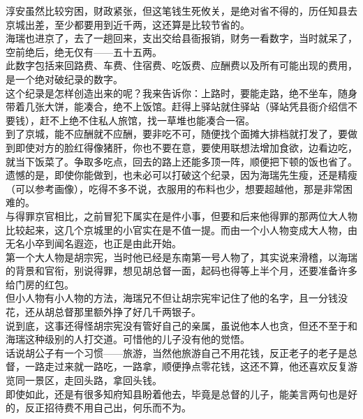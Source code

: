 \begin{multicols}{\theparacolNo}
淳安虽然比较穷困，财政紧张，但这笔钱生死攸关，是绝对省不得的，历任知县去京城出差，至少都要用到近千两，这还算是比较节省的。\\

海瑞也进京了，去了一趟回来，支出交给县衙报销，财务一看数字，当时就呆了，空前绝后，绝无仅有——五十五两。\\

此数字包括来回路费、车费、住宿费、吃饭费、应酬费以及所有可能出现的费用，是一个绝对破纪录的数字。\\

这个纪录是怎样创造出来的呢？我来告诉你：上路时，要能走路，绝不坐车，随身带着几张大饼，能凑合，绝不上饭馆。赶得上驿站就住驿站（驿站凭县衙介绍信不要钱），赶不上绝不住私人旅馆，找一草堆也能凑合一宿。\\

到了京城，能不应酬就不应酬，要非吃不可，随便找个面摊大排档就打发了，要做到即使对方的脸红得像猪肝，你也不要在意，要使用联想法增加食欲，边看边吃，就当下饭菜了。争取多吃点，回去的路上还能多顶一阵，顺便把下顿的饭也省了。\\

遗憾的是，即使你能做到，也未必可以打破这个纪录，因为海瑞先生瘦，还是精瘦（可以参考画像），吃得不多不说，衣服用的布料也少，想要超越他，那是非常困难的。\\

与得罪京官相比，之前冒犯下属实在是件小事，但要和后来他得罪的那两位大人物比较起来，这几个京城里的小官实在是不值一提。而由一个小人物变成大人物，由无名小卒到闻名遐迩，也正是由此开始。\\

第一个大人物是胡宗宪，当时他已经是东南第一号人物了，其实说来滑稽，以海瑞的背景和官衔，别说得罪，想见胡总督一面，起码也得等上半个月，还要准备许多给门房的红包。\\

但小人物有小人物的方法，海瑞兄不但让胡宗宪牢记住了他的名字，且一分钱没花，还从胡总督那里额外挣了好几千两银子。\\

说到底，这事还得怪胡宗宪没有管好自己的亲属，虽说他本人也贪，但还不至于和海瑞这种级别的人打交道。可惜他的儿子没有他的觉悟。\\

话说胡公子有一个习惯——旅游，当然他旅游自己不用花钱，反正老子的老子是总督，一路走过来就一路吃，一路拿，顺便挣点零花钱，这还不算，他还喜欢反复游览同一景区，走回头路，拿回头钱。\\

即使如此，还是有很多知府知县盼着他去，毕竟是总督的儿子，能美言两句也是好的，反正招待费不用自己出，何乐而不为。\\


\end{multicols}
